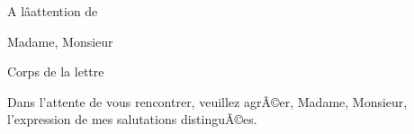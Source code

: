 \documentclass[10pt]{lettre}
\begin{document}
\begin{letter}{A lâattention de} %

\signature{PrÃ©nom \textsc{Nom}}
\address{PrÃ©nom \textsc{Nom}\\Adresse}
\nofax %


\opening{Madame, Monsieur} %

 Corps de la lettre
  
  
\closing{Dans l'attente de vous rencontrer, veuillez agrÃ©er, Madame, Monsieur, l'expression de mes salutations distinguÃ©es.} %




\end{letter}
\end{document}
